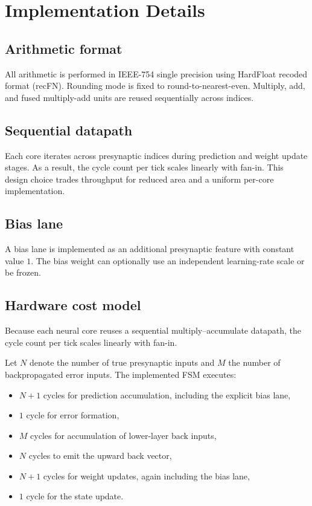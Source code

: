 \documentclass{article}
\begin{document}
\section{Implementation Details}
\label{sec:impl}

\subsection{Arithmetic format}
All arithmetic is performed in IEEE-754 single precision using HardFloat recoded format (recFN). Rounding mode is fixed to round-to-nearest-even. Multiply, add, and fused multiply-add units are reused sequentially across indices.

\subsection{Sequential datapath}
Each core iterates across presynaptic indices during prediction and weight update stages. As a result, the cycle count per tick scales linearly with fan-in. This design choice trades throughput for reduced area and a uniform per-core implementation.

\subsection{Bias lane}
A bias lane is implemented as an additional presynaptic feature with constant value \(1\). The bias weight can optionally use an independent learning-rate scale or be frozen.

\subsection{Hardware cost model}

Because each neural core reuses a sequential multiply--accumulate datapath,
the cycle count per tick scales linearly with fan-in.

Let \(N\) denote the number of true presynaptic inputs and \(M\) the number of
backpropagated error inputs. The implemented FSM executes:
\begin{itemize}[leftmargin=*]
\item \(N+1\) cycles for prediction accumulation, including the explicit bias lane,
\item \(1\) cycle for error formation,
\item \(M\) cycles for accumulation of lower-layer back inputs,
\item \(N\) cycles to emit the upward back vector,
\item \(N+1\) cycles for weight updates, again including the bias lane,
\item \(1\) cycle for the state update.
\end{itemize}
\end{document}
